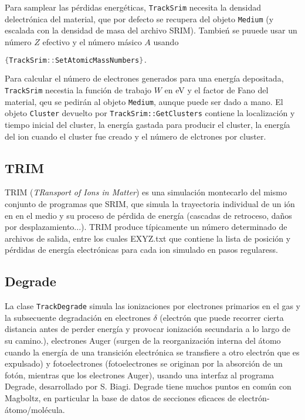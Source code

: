 Para samplear las pérdidas energéticas, \texttt{TrackSrim} necesita la densidad delectrónica del material, que por defecto se recupera del objeto \texttt{Medium} (y escalada con la densidad de masa del archivo SRIM). Tambień se puuede usar un número $Z$ efectivo y el número másico $A$ usando

\begin{lstlisting}[language=C++,style=c++]
{TrackSrim::SetAtomicMassNumbers}.
\end{lstlisting}
\vspace*{0.6em}


Para calcular el número de electrones generados para una energía depositada, \texttt{TrackSrim} necestia la función de trabajo $W$ en eV y el factor de Fano del material, qeu se pedirán al objeto \texttt{Medium}, aunque puede ser dado a mano. El objeto \texttt{Cluster} devuelto por \texttt{TrackSrim::GetClusters} contiene la localización y tiempo inicial del cluster, la energía gastada para producir el cluster, la energía del ion cuando el cluster fue creado y el número de elctrones por cluster. 

\subsection{TRIM}

TRIM (\textit{TRansport of Ions in Matter}) es una simulación montecarlo del mismo conjunto de programas que SRIM, que simula la trayectoria individual de un ión en en el medio y su proceso de pérdida de energía (cascadas de retroceso, daños por desplazamiento...). TRIM produce típicamente un número determinado de archivos de salida, entre los cuales EXYZ.txt que contiene la lista de posición y pérdidas de energía electrónicas para cada ion simulado en pasos regularess.

\subsection{Degrade}

La clase \texttt{TrackDegrade} simula las ionizaciones por electrones primarios en el gas y la subsecuente degradación en electrones $\delta$ (electrón que puede recorrer cierta distancia antes de perder energía y provocar ionización secundaria a lo largo de su camino.), electrones Auger (surgen de la reorganización interna del átomo cuando la energía de una transición electrónica se transfiere a otro electrón que es expulsado) y fotoelectrones (fotoelectrones se originan por la absorción de un fotón, mientras que los electrones Auger), usando una interfaz al programa Degrade, desarrollado por S. Biagi. Degrade tiene muchos puntos en común con Magboltz, en particular la base de datos de secciones eficaces de electrón-átomo/molécula. 

